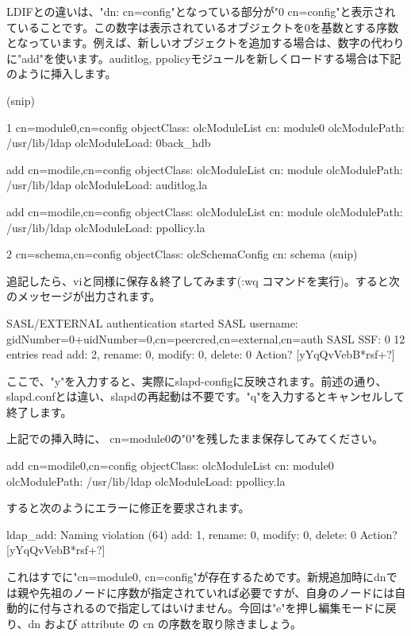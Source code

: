 \documentclass[mingoth,a4paper]{jsarticle}
\begin{document}
LDIFとの違いは、"dn: cn=config"となっている部分が"0 cn=config"と表示されていることです。この数字は表示されているオブジェクトを0を基数とする序数となっています。例えば、新しいオブジェクトを追加する場合は、数字の代わりに"add"を使います。auditlog, ppolicyモジュールを新しくロードする場合は下記のように挿入します。

\begin{commandline}
(snip)

1 cn=module{0},cn=config
objectClass: olcModuleList
cn: module{0}
olcModulePath: /usr/lib/ldap
olcModuleLoad: {0}back_hdb

add cn=modile,cn=config
objectClass: olcModuleList
cn: module
olcModulePath: /usr/lib/ldap
olcModuleLoad: auditlog.la

add cn=modile,cn=config
objectClass: olcModuleList
cn: module
olcModulePath: /usr/lib/ldap
olcModuleLoad: ppollicy.la

2 cn=schema,cn=config
objectClass: olcSchemaConfig
cn: schema
(snip)
\end{commandline}

追記したら、viと同様に保存＆終了してみます(:wq コマンドを実行)。すると次のメッセージが出力されます。

\begin{commandline}
SASL/EXTERNAL authentication started
SASL username: gidNumber=0+uidNumber=0,cn=peercred,cn=external,cn=auth
SASL SSF: 0
     12 entries read                                                              
add: 2, rename: 0, modify: 0, delete: 0
Action? [yYqQvVebB*rsf+?] 
\end{commandline}

ここで、"y"を入力すると、実際にslapd-configに反映されます。前述の通り、slapd.confとは違い、slapdの再起動は不要です。"q"を入力するとキャンセルして終了します。

上記での挿入時に、 cn=module{0}の"{0}"を残したまま保存してみてください。

\begin{commandline}
add cn=modile{0},cn=config
objectClass: olcModuleList
cn: module{0}
olcModulePath: /usr/lib/ldap
olcModuleLoad: ppollicy.la
\end{commandline}

すると次のようにエラーに修正を要求されます。
\begin{commandline}
ldap_add: Naming violation (64)
add: 1, rename: 0, modify: 0, delete: 0
Action? [yYqQvVebB*rsf+?] 
\end{commandline}

これはすでに"cn=module{0}, cn=config"が存在するためです。新規追加時にdnでは親や先祖のノードに序数が指定されていれば必要ですが、自身のノードには自動的に付与されるので指定してはいけません。今回は"e"を押し編集モードに戻り、dn および attribute の cn の序数を取り除きましょう。
\end{document}
